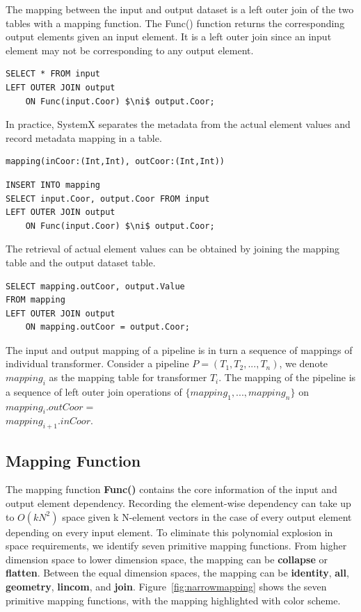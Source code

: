 \documentclass{sig-alternate}
\begin{document}
The mapping between the input and output dataset is a left outer join of the two tables with a mapping function.
The Func() function returns the corresponding output elements given an input element. 
It is a left outer join since an input element may not be corresponding to any output element.
\begin{lstlisting}
SELECT * FROM input
LEFT OUTER JOIN output 
    ON Func(input.Coor) $\ni$ output.Coor;
\end{lstlisting}

In practice, SystemX separates the metadata from the actual element values and record metadata mapping
in a table.
\begin{lstlisting}
mapping(inCoor:(Int,Int), outCoor:(Int,Int))
\end{lstlisting}

\begin{lstlisting}
INSERT INTO mapping
SELECT input.Coor, output.Coor FROM input
LEFT OUTER JOIN output 
    ON Func(input.Coor) $\ni$ output.Coor;
\end{lstlisting}

The retrieval of actual element values can be obtained by joining the mapping table and the output dataset table.
\begin{lstlisting}
SELECT mapping.outCoor, output.Value
FROM mapping
LEFT OUTER JOIN output 
    ON mapping.outCoor = output.Coor;
\end{lstlisting}

The input and output mapping of a pipeline is in turn a sequence of mappings of individual transformer.
Consider a pipeline $P=(T_1, T_2, ..., T_n)$, we denote $mapping_i$ as the mapping table for transformer $T_i$.
The mapping of the pipeline is a sequence of left outer join operations of $\{mapping_1, ..., mapping_n\}$ 
on $mapping_i.outCoor = $\\$mapping_{i+1}.inCoor$.

\subsection{Mapping Function}
\label{sec:Map-Func}
The mapping function {\bf Func()} contains the core information of the input and output element dependency.
Recording the element-wise dependency can take up to $O(kN^2)$ space given k N-element vectors in the case
of every output element depending on every input element. 
To eliminate this polynomial explosion in space requirements, we identify seven primitive mapping functions.
From higher dimension space to lower dimension space, the mapping can be {\bf collapse} or {\bf flatten}.
Between the equal dimension spaces, the mapping can be {\bf identity}, {\bf all}, {\bf geometry}, {\bf lincom}, and {\bf join}.
Figure~\ref{fig:narrowmapping} shows the seven primitive mapping functions, with the mapping highlighted with color scheme.
\end{document}
